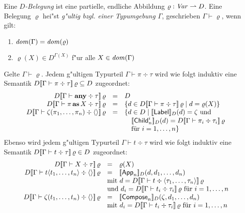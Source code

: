 \documentclass[12pt,a4paper,draft]{article}
\DeclareMathOperator{\as}{\textbf{as}}
\newcommand{\any}{\textbf{any}}
\newcommand{\Tj}[3]{{#1}\vdash{#2}\div{#3}}
\begin{document}
Eine \emph{$D$-Belegung} ist eine partielle, endliche Abbildung $\varrho: \mathit{Var} \rightharpoonup D$. Eine Belegung
$\varrho$ hei"st \emph{g"ultig bzgl. einer Typumgebung $\Gamma$}, geschrieben $\Gamma \vdash \varrho$,
wenn gilt:
\begin{enumerate}
\item $\mathit{dom}(\Gamma) = \mathit{dom}(\varrho)$
\item $\varrho(X) \in D^{\Gamma(X)}$ f"ur alle $X \in \mathit{dom}(\Gamma)$
\end{enumerate}
Gelte $\Gamma \vdash \varrho$.
Jedem g"ultigen Typurteil $\Tj{\Gamma}{\pi}{\tau}$ wird wie folgt induktiv
eine Semantik $D\sem{\Tj{\Gamma}{\pi}{\tau}}\,\varrho \subseteq D$ zugeordnet:
\[\begin{array}{rcl}
  D\sem{\Tj{\Gamma}{\any}{\tau}}\,\varrho
  &=& D
  \\
  D\sem{\Tj{\Gamma}{\pi \as X}{\tau}}\,\varrho
  &=& \{d \in D\sem{\Tj{\Gamma}{\pi}{\tau}}\,\varrho \mid d = \varrho(X) \}
  \\
  D\sem{\Tj{\Gamma}{\zeta(\pi_1,\ldots,\pi_n)}{\langle \rangle}}\,\varrho
  &=& \{ d \in D \mid \sem{\Label}_D(d) = \zeta \text{ und} \\
  && \quad \sem{\Child_n^i}_D(d) = D\sem{\Tj{\Gamma}{\pi_i}{\tau_i}}\,\varrho \\
  && \quad \text{f\"ur $i=1,\ldots,n$} \}
  \\
\end{array}\]
Ebenso wird jedem g"ultigen Typurteil $\Tj{\Gamma}{t}{\tau}$ wird wie folgt induktiv
eine Semantik $D\sem{\Tj{\Gamma}{t}{\tau}}\,\varrho \in D$ zugeordnet:
\[\begin{array}{rcl}
  D\sem{\Tj{\Gamma}{X}{\tau}}\,\varrho
  &=& \varrho(X)
  \\
  D\sem{\Tj{\Gamma}{t \langle t_1,\ldots,t_n \rangle}{\langle \rangle}}\,\varrho
  &=& \sem{\App_n}_D(d, d_1, \ldots, d_n) \\
  & \multicolumn{2}{l}{\text{mit } d = D\sem{\Tj{\Gamma}{t}{\langle\tau_1,\ldots,\tau_n\rangle}}\,\varrho} \\
  & \multicolumn{2}{l}{\text{und } d_i = D\sem{\Tj{\Gamma}{t_i}{\tau_i}}\,\varrho \text{ f\"ur $i=1,\ldots,n$}}
  \\
  D\sem{\Tj{\Gamma}{\zeta(t_1,\ldots,t_n)}{\langle \rangle}}\,\varrho
  &=& \sem{\Compose_n}_D(\zeta,d_1,\ldots,d_n) \\
  & \multicolumn{2}{l}{\text{mit } d_i = D\sem{\Tj{\Gamma}{t_i}{\tau_i}}\,\varrho \text{ f\"ur $i=1,\ldots,n$}}
  \\
\end{array}\]
\end{document}
